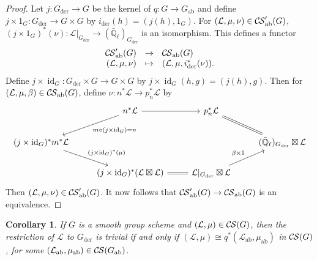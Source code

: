 \documentclass[10pt]{amsart}
\theoremstyle{plain}
\newtheorem{corollary}[theorem]{Corollary}
\theoremstyle{definition}
\newcommand{\EE}{\mathbb{\bar Q}_\ell}
\DeclareMathOperator{\id}{id}
\newcommand{\der}{_{\operatorname{der}}}
\newcommand{\ab}{_{\operatorname{ab}}}
\newcommand{\cs}[1]{{\mathcal{#1}}}
\newcommand{\CS}{{\mathcal{C\hskip-0.8pt S}}}
\newcommand{\CSab}{\CS_{\operatorname{ab}}}
\begin{document}
\begin{proof}
Let $j : G\der \to G$ be the kernel of $q:G \to G\ab$ and define $j\times 1_G : G\der \to G\times G$ by $i\der(h) = (j(h),1_G)$.
For $(\cs{L},\mu,\nu)\in \CSab'(G)$, $(j\times 1_G)^*(\nu) : \cs{L}\vert_{G\der} \to (\EE)_{G\der}$ is an isomorphism.
This defines a functor
\[
\begin{array}{rcl}
\CSab'(G) &\to& \CSab(G) \\
(\cs{L},\mu,\nu) &\mapsto& (\cs{L},\mu,i\der^*(\nu)).
\end{array}
\]
Define $j\times\id_G: G\der\times G\to G\times G$ by $j\times\id_G(h,g) = (j(h),g)$.
Then for $(\cs{L},\mu,\beta) \in \CSab(G)$, define $\nu : n^*\cs{L} \to p_n^*\cs{L}$ by
\[
\begin{tikzcd}
& n^* \cs{L} \arrow{dl}{m\circ (j\times\id_G) = n} \arrow{r} & p_n^*\cs{L} &  \\ 
(j\times\id_G)^* m^* \cs{L} \arrow{dr}{(j\times\id_G)^*(\mu)} &&& (\EE)_{G\der} \boxtimes \cs{L} \arrow[equal]{ul} \\
& (j\times\id_G)^*(\cs{L}\boxtimes\cs{L}) \arrow[equal]{r} & \cs{L}\vert_{G\der}\boxtimes \cs{L} \arrow{ur}{\beta\times 1}
\end{tikzcd}
\]
Then $(\cs{L},\mu,\nu)\in \CSab'(G)$.
It now follows that $\CSab'(G) \to \CSab(G)$ is an equivalence.
\end{proof}

\begin{corollary} 
If $G$ is a smooth group scheme and $(\cs{L},\mu) \in \CS(G)$, then
the restriction of $\cs{L}$ to $G\der$ is trivial if and only if $(\cs{L},\mu) \cong q^*(\cs{L}\ab,\mu\ab)$ in $\CS(G)$, for some $(\cs{L}\ab,\mu\ab) \in \CS(G\ab)$. 
\end{corollary}
\end{document}
